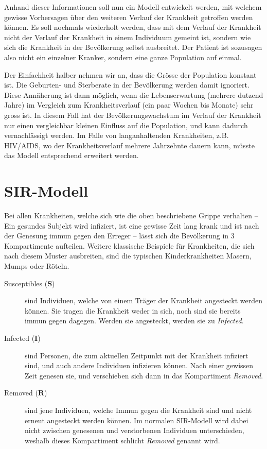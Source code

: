 \begin{refsection}
Anhand dieser Informationen soll nun ein Modell entwickelt werden, mit welchem gewisse Vorhersagen über den weiteren Verlauf der Krankheit getroffen werden können. 
Es soll nochmals wiederholt werden, dass mit dem Verlauf der Krankheit nicht der Verlauf der Krankheit in einem Individuum gemeint ist, sondern wie sich die Krankheit in der Bevölkerung selbst ausbreitet. 
Der Patient ist sozusagen also nicht ein einzelner Kranker, sondern eine ganze Population auf einmal.

Der Einfachheit halber nehmen wir an, dass die Grösse der Population konstant ist.
Die Geburten- und Sterberate in der Bevölkerung werden damit ignoriert.
Diese Annäherung ist dann möglich, wenn die Lebenserwartung (mehrere dutzend Jahre) im Vergleich zum Krankheitsverlauf (ein paar Wochen bis Monate) sehr gross ist.
In diesem Fall hat der Bevölkerungswachstum im Verlauf der Krankheit nur einen vergleichbar kleinen Einfluss auf die Population, und kann dadurch vernachlässigt werden.
Im Falle von langanhaltenden Krankheiten, z.B. HIV/AIDS, wo der Krankheitsverlauf mehrere Jahrzehnte dauern kann, müsste das Modell entsprechend erweitert werden.



\section{SIR-Modell}
Bei allen Krankheiten, welche sich wie die oben beschriebene Grippe verhalten -- Ein gesundes Subjekt wird infiziert, ist eine gewisse Zeit lang krank und ist nach der Genesung immun gegen den Erreger -- lässt sich die Bevölkerung in 3 Kompartimente aufteilen. Weitere klassische Beispiele für Krankheiten, die sich nach diesem Muster ausbreiten, sind die typischen Kinderkrankheiten Masern, Mumps oder Röteln.
\begin{description}
  \item [Susceptibles ($\mathbf{S}$)] sind Individuen, welche von einem Träger der Krankheit angesteckt werden können. Sie tragen die Krankheit weder in sich, noch sind sie bereits immun gegen dagegen. Werden sie angesteckt, werden sie zu \emph{Infected}.
  \item [Infected ($\mathbf{I}$)] sind Personen, die zum aktuellen Zeitpunkt mit der Krankheit infiziert sind, und auch andere Individuen infizieren können. Nach einer gewissen Zeit genesen sie, und verschieben sich dann in das Kompartiment \emph{Removed}.
  \item [Removed ($\mathbf{R}$)] sind jene Individuen, welche Immun gegen die Krankheit sind und nicht erneut angesteckt werden können. Im normalen SIR-Modell wird dabei nicht zwischen genesenen und verstorbenen Individuen unterschieden, weshalb dieses Kompartiment schlicht \emph{Removed} genannt wird.
\end{description}


\end{refsection}
